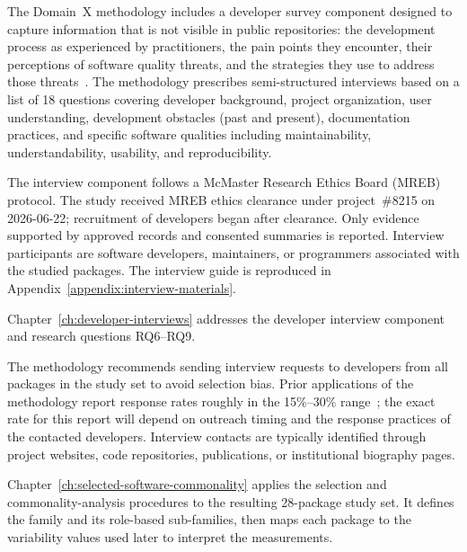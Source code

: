 The Domain~X methodology includes a developer survey component designed to capture information that is not visible in public repositories: the development process as experienced by practitioners, the pain points they encounter, their perceptions of software quality threats, and the strategies they use to address those threats~\citep{Smith2021}. The methodology prescribes semi-structured interviews based on a list of 18 questions covering developer background, project organization, user understanding, development obstacles (past and present), documentation practices, and specific software qualities including maintainability, understandability, usability, and reproducibility.

The interview component follows a McMaster Research Ethics Board (MREB) protocol. The study received MREB ethics clearance under project~\#8215 on 2026-06-22; recruitment of developers began after clearance. Only evidence supported by approved records and consented summaries is reported.
Interview participants are software developers, maintainers, or programmers associated with the studied packages. The interview guide is reproduced in Appendix~\ref{appendix:interview-materials}.

Chapter~\ref{ch:developer-interviews} addresses the developer interview component and research questions RQ6--RQ9.

The methodology recommends sending interview requests to developers from all packages in the study set to avoid selection bias. Prior applications of the methodology report response rates roughly in the 15\%--30\% range~\citep{Smith2021,Smith2024MI}; the exact rate for this report will depend on outreach timing and the response practices of the contacted developers. Interview contacts are typically identified through project websites, code repositories, publications, or institutional biography pages.

Chapter~\ref{ch:selected-software-commonality} applies the selection and commonality-analysis procedures to the resulting 28-package study set. It defines the family and its role-based sub-families, then maps each package to the variability values used later to interpret the measurements.
